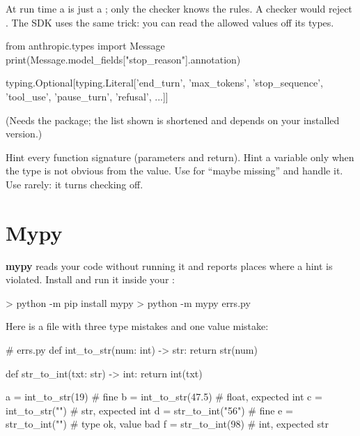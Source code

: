 At run time a  is just a ; only the checker knows the rules. A checker would reject
. The SDK uses the same trick: you can read the allowed
 values off its types.

\begin{pycode}
from anthropic.types import Message
print(Message.model_fields["stop_reason"].annotation)
\end{pycode}
\begin{rawcode}
typing.Optional[typing.Literal['end_turn', 'max_tokens', 'stop_sequence', 'tool_use', 'pause_turn', 'refusal', ...]]
\end{rawcode}

(Needs the  package; the list shown is shortened and depends on your installed version.)

\begin{gamerule}
Hint every function signature (parameters and return). Hint a variable only when the type is not obvious from
the value. Use  for ``maybe missing'' and handle it. Use  rarely: it turns checking off.
\end{gamerule}

\section{Mypy}

\textbf{mypy} reads your code without running it and reports places where a hint is violated. Install and run it
inside your :

\begin{rawcode}
> python -m pip install mypy
> python -m mypy errs.py
\end{rawcode}

Here is a file with three type mistakes and one value mistake:

\begin{pycode}
# errs.py
def int_to_str(num: int) -> str:
    return str(num)

def str_to_int(txt: str) -> int:
    return int(txt)

a = int_to_str(19)        # fine
b = int_to_str(47.5)      # float, expected int
c = int_to_str("")        # str, expected int
d = str_to_int("56")      # fine
e = str_to_int("")        # type ok, value bad
f = str_to_int(98)        # int, expected str
\end{pycode}

